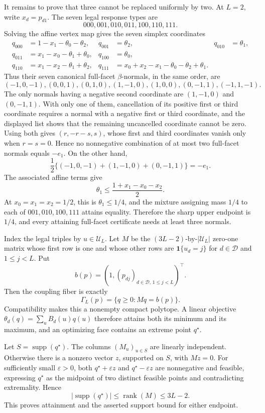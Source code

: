 It remains to prove that three cannot be replaced uniformly by two.  At \(L=2\), write \(x_d=p_{d1}\).  The seven legal response types are
\[
 000,001,010,011,100,110,111.
\]
Solving the affine vertex map gives the seven simplex coordinates
\[
\begin{aligned}
 q_{000}&=1-x_1-\theta_0-\theta_2,&q_{001}&=\theta_2,&q_{010}&=\theta_1,\\
 q_{011}&=x_1-x_0-\theta_1+\theta_0,&q_{100}&=\theta_0,\\
 q_{110}&=x_1-x_2-\theta_1+\theta_2,&
 q_{111}&=x_0+x_2-x_1-\theta_0-\theta_2+\theta_1.
\end{aligned}
\]
Thus their seven canonical full-facet \(\beta\)-normals, in the same order, are
\[
 (-1,0,-1),(0,0,1),(0,1,0),(1,-1,0),(1,0,0),(0,-1,1),(-1,1,-1).
\]
The only normals having a negative second coordinate are \((1,-1,0)\) and \((0,-1,1)\).  With only one of them, cancellation of its positive first or third coordinate requires a normal with a negative first or third coordinate, and the displayed list shows that the remaining uncancelled coordinate cannot be zero.  Using both gives \((r,-r-s,s)\), whose first and third coordinates vanish only when \(r=s=0\).  Hence no nonnegative combination of at most two full-facet normals equals \(-e_1\).  On the other hand,
\[
 \frac12\{(-1,0,-1)+(1,-1,0)+(0,-1,1)\}=-e_1.
\]
The associated affine terms give
\[
 \theta_1\le\frac{1+x_1-x_0-x_2}{2}.
\]
At \(x_0=x_1=x_2=1/2\), this is \(\theta_1\le1/4\), and the mixture assigning mass \(1/4\) to each of \(001,010,100,111\) attains equality.  Therefore the sharp upper endpoint is \(1/4\), and every attaining full-facet certificate needs at least three normals.

Index the legal triples by \(u\in\mathcal U_L\).  Let \(M\) be the \((3L-2)\)-by-\(|\mathcal U_L|\) zero-one matrix whose first row is one and whose other rows are \(\mathbf 1\{u_d=j\}\) for \(d\in\mathcal D\) and \(1\le j<L\).  Put
\[
 b(p)=(1,(p_{dj})_{d\in\mathcal D,\,1\le j<L})^\top.
\]
Then the coupling fiber is exactly
\[
 \Gamma_L(p)=\{q\ge0:Mq=b(p)\}.
\]
Compatibility makes this a nonempty compact polytope.  A linear objective \(\theta_d(q)=\sum_uB_d(u)q(u)\) therefore attains both its minimum and its maximum, and an optimizing face contains an extreme point \(q^\star\).

Let \(S=\operatorname{supp}(q^\star)\).  The columns \((M_u)_{u\in S}\) are linearly independent.  Otherwise there is a nonzero vector \(z\), supported on \(S\), with \(Mz=0\).  For sufficiently small \(\varepsilon>0\), both \(q^\star+\varepsilon z\) and \(q^\star-\varepsilon z\) are nonnegative and feasible, expressing \(q^\star\) as the midpoint of two distinct feasible points and contradicting extremality.  Hence
\[
 |\operatorname{supp}(q^\star)|\le\operatorname{rank}(M)\le3L-2.
\]
This proves attainment and the asserted support bound for either endpoint.

